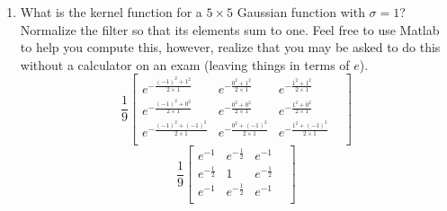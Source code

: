 \documentclass{article}
\begin{document}
\begin{enumerate}
\item What is the kernel function for a $5\times5$ Gaussian function with $\sigma=1$?   Normalize the filter so that its elements sum to one.  Feel free to use Matlab to help you compute this, however, realize that you may be asked to do this without a calculator on an exam (leaving things in terms of $e$).
$$
\frac{1}{9}
\begin{bmatrix}
e^{-\frac{(-1)^2+1^2}{2 \times 1}}&      e^{-\frac{0^2+1^2}{2 \times 1}}&     e^{-\frac{1^2+1^2}{2 \times 1}}&     \\
e^{-\frac{(-1)^2+0^2}{2 \times 1}}&      e^{-\frac{0^2+0^2}{2 \times 1}}&     e^{-\frac{1^2+0^2}{2 \times 1}}&     \\
e^{-\frac{(-1)^2+(-1)^2}{2 \times 1}}&   e^{-\frac{0^2+(-1)^2}{2 \times 1}}&  e^{-\frac{1^2+(-1)^2}{2 \times 1}}&  \\

\end{bmatrix}
$$
$$
\frac{1}{9}
\begin{bmatrix}
e^{-1}&             e^{-\frac{1}{2}}&   e^{-1}&             \\
e^{-\frac{1}{2}}&   1&                  e^{-\frac{1}{2}}&   \\
e^{-1}&             e^{-\frac{1}{2}}&   e^{-1}&             \\
\end{bmatrix}
$$


\end{enumerate}
\end{document}
